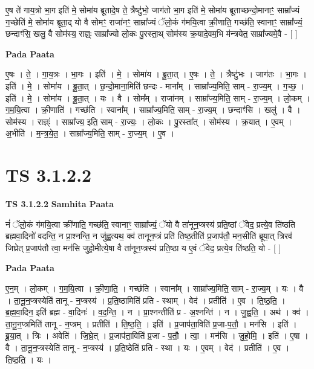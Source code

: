 \documentclass[17pt]{extarticle}
\begin{document}
ए॒ष ते॑ गाय॒त्रो भा॒ग इति॑ मे॒ सोमा॑य ब्रूतादे॒ष ते॒ त्रैष्टु॑भो॒ जाग॑तो भा॒ग इति॑ मे॒ सोमा॑य ब्रूताच्छन्दो॒मानाꣳ॒॒ साम्रा᳚ज्यं ग॒च्छेति॑ मे॒ सोमा॑य ब्रूता॒द् यो वै सोमꣳ॒॒ राजा॑नꣳ॒॒ साम्रा᳚ज्यं ॅलो॒कं ग॑मयि॒त्वा क्री॒णाति॒ गच्छ॑ति॒ स्वानाꣳ॒॒ साम्रा᳚ज्यं॒ छन्दाꣳ॑सि॒ खलु॒ वै सोम॑स्य॒ राज्ञ्ः॒ साम्रा᳚ज्यो लो॒कः पु॒रस्ता॒थ् सोम॑स्य क्र॒यादे॒वम॒भि म॑न्त्रयेत॒ साम्रा᳚ज्यमे॒वै - [  ] \newline

\textbf{Pada Paata} \newline

ए॒षः । ते॒ । गा॒य॒त्रः । भा॒गः । इति॑ । मे॒ । सोमा॑य । ब्रू॒ता॒त् । ए॒षः । ते॒ । त्रैष्टु॑भः । जाग॑तः । भा॒गः । इति॑ । मे॒ । सोमा॑य । ब्रू॒ता॒त् । छ॒न्दो॒माना॒मिति॑ छन्दः - माना᳚म् । साम्रा᳚ज्य॒मिति॒ साम् - रा॒ज्य॒म् । ग॒च्छ॒ । इति॑ । मे॒ । सोमा॑य । ब्रू॒ता॒त् । यः । वै । सोम᳚म् । राजा॑नम् । साम्रा᳚ज्य॒मिति॒ साम् - रा॒ज्य॒म् । लो॒कम् । ग॒म॒यि॒त्वा । क्री॒णाति॑ । गच्छ॑ति । स्वाना᳚म् । साम्रा᳚ज्य॒मिति॒ साम् - रा॒ज्य॒म् । छन्दाꣳ॑सि । खलु॑ । वै । सोम॑स्य । राज्ञ्ः॑ । साम्रा᳚ज्य॒ इति॒ साम् - रा॒ज्यः॒ । लो॒कः । पु॒रस्ता᳚त् । सोम॑स्य । क्र॒यात् । ए॒वम् । अ॒भीति॑ । म॒न्त्र॒ये॒त॒ । साम्रा᳚ज्य॒मिति॒ साम् - रा॒ज्य॒म् । ए॒व ।  \newline




\section*{ TS 3.1.2.2 }

\textbf{TS 3.1.2.2 } \newline
\textbf{Samhita Paata} \newline

नं॑ ॅलो॒कं ग॑मयि॒त्वा क्री॑णाति॒ गच्छ॑ति॒ स्वानाꣳ॒॒ साम्रा᳚ज्यं॒ ॅयो वै ता॑नून॒प्त्रस्य॑ प्रति॒ष्ठां ॅवेद॒ प्रत्ये॒व ति॑ष्ठति ब्रह्मवा॒दिनो॑ वदन्ति॒ न प्रा॒श्नन्ति॒ न जु॑ह्व॒त्यथ॒ क्व॑ तानून॒प्त्रं प्रति॑ तिष्ठ॒तीति॑ प्र॒जाप॑तौ॒ मन॒सीति॑ ब्रूया॒त् त्रिरव॑ जिघ्रेत् प्र॒जाप॑तौ त्वा॒ मन॑सि जुहो॒मीत्ये॒षा वै ता॑नून॒प्त्रस्य॑ प्रति॒ष्ठा य ए॒वं ॅवेद॒ प्रत्ये॒व ति॑ष्ठति॒ यो - [  ] \newline

\textbf{Pada Paata} \newline

ए॒न॒म् । लो॒कम् । ग॒म॒यि॒त्वा । क्री॒णा॒ति॒ । गच्छ॑ति । स्वाना᳚म् । साम्रा᳚ज्य॒मिति॒ साम् - रा॒ज्य॒म् । यः । वै । ता॒नू॒न॒प्त्रस्येति॑ तानू - न॒प्त्रस्य॑ । प्र॒ति॒ष्ठामिति॑ प्रति - स्थाम् । वेद॑ । प्रतीति॑ । ए॒व । ति॒ष्ठ॒ति॒ । ब्र॒ह्म॒वा॒दिन॒ इति॑ ब्रह्म - वा॒दिनः॑ । व॒द॒न्ति॒ । न । प्रा॒श्नन्तीति॑ प्र - अ॒श्नन्ति॑ । न । जु॒ह्व॒ति॒ । अथ॑ । क्व॑ । ता॒नू॒न॒प्त्रमिति॑ तानू - न॒प्त्रम् । प्रतीति॑ । ति॒ष्ठ॒ति॒ । इति॑ । प्र॒जाप॑ता॒विति॑ प्र॒जा-प॒तौ॒ । मन॑सि । इति॑ । ब्रू॒या॒त् । त्रिः । अवेति॑ । जि॒घ्रे॒त् । प्र॒जाप॑ता॒विति॑ प्र॒जा - प॒तौ॒ । त्वा॒ । मन॑सि । जु॒हो॒मि॒ । इति॑ । ए॒षा । वै । ता॒नू॒न॒प्त्रस्येति॑ तानू - न॒प्त्रस्य॑ । प्र॒ति॒ष्ठेति॑ प्रति - स्था । यः । ए॒वम् । वेद॑ । प्रतीति॑ । ए॒व । ति॒ष्ठ॒ति॒ । यः ।  \newline
\end{document}
